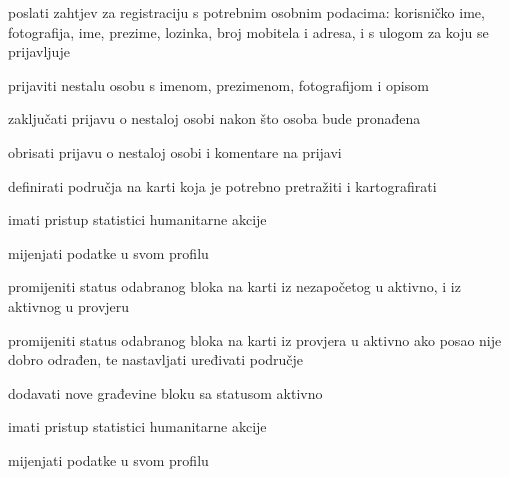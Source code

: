 			
			\begin{packed_enum}
				\item  {}
				
				\begin{packed_enum}
					
					\item poslati zahtjev za registraciju s potrebnim osobnim podacima: korisničko ime, fotografija, ime, prezime, lozinka, broj mobitela i adresa, i s ulogom za koju se prijavljuje
					\item prijaviti nestalu osobu s imenom, prezimenom, fotografijom i opisom
					
					
				\end{packed_enum}
			
				\item  {}
				
				\begin{packed_enum}
					
					\item zaključati prijavu o nestaloj osobi nakon što osoba bude pronađena
					\item obrisati prijavu o nestaloj osobi i komentare na prijavi
					\item definirati područja na karti koja je potrebno pretražiti i kartografirati
					\item imati pristup statistici humanitarne akcije
					\item mijenjati podatke u svom profilu

					
				\end{packed_enum}
				
				\item  {}
				
				\begin{packed_enum}
					
					\item promijeniti status odabranog bloka na karti iz nezapočetog u aktivno, i iz aktivnog u provjeru
					\item promijeniti status odabranog bloka na karti iz provjera u aktivno ako posao nije dobro odrađen, te nastavljati uređivati područje
					\item dodavati nove građevine bloku sa statusom aktivno
					\item imati pristup statistici humanitarne akcije
					\item mijenjati podatke u svom profilu



\end{packed_enum}
\end{packed_enum}
